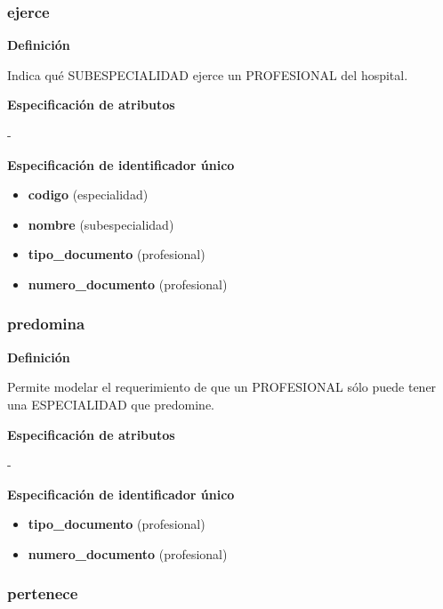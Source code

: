 \documentclass[a4paper,11pt]{article}
\begin{document}
\subsubsection{\textbf{ejerce}}

\textbf{Definición}

Indica qué SUBESPECIALIDAD ejerce un PROFESIONAL del hospital.

\textbf{Especificación de atributos}

-

\textbf{Especificación de identificador único}

\begin{itemize}

     \item \textbf{codigo} (especialidad)

     \item \textbf{nombre} (subespecialidad)

     \item \textbf{tipo\_documento} (profesional)

     \item \textbf{numero\_documento} (profesional)

\end{itemize}

\subsubsection{\textbf{predomina}}

\textbf{Definición}

Permite modelar el requerimiento de que un PROFESIONAL sólo puede tener una ESPECIALIDAD 
que predomine.

\textbf{Especificación de atributos}

-

\textbf{Especificación de identificador único}

\begin{itemize}

     \item \textbf{tipo\_documento} (profesional)

     \item \textbf{numero\_documento} (profesional)

\end{itemize}

\subsubsection{\textbf{pertenece}}
\end{document}
